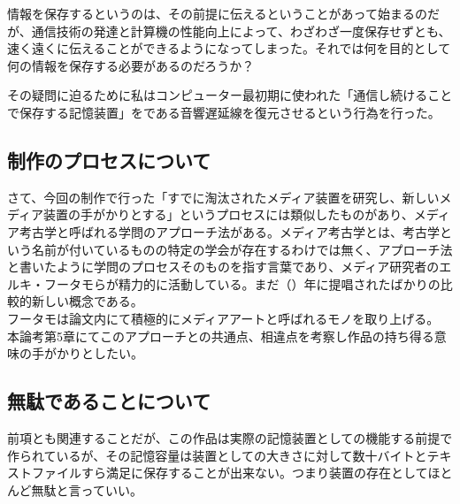 情報を保存するというのは、その前提に伝えるということがあって始まるのだが、通信技術の発達と計算機の性能向上によって、わざわざ一度保存せずとも、速く遠くに伝えることができるようになってしまった。それでは何を目的として何の情報を保存する必要があるのだろうか？

その疑問に迫るために私はコンピューター最初期に使われた「通信し続けることで保存する記憶装置」をである音響遅延線を復元させるという行為を行った。

\subsection{制作のプロセスについて}\label{ux5236ux4f5cux306eux30d7ux30edux30bbux30b9ux306bux3064ux3044ux3066}

さて、今回の制作で行った「すでに淘汰されたメディア装置を研究し、新しいメディア装置の手がかりとする」というプロセスには類似したものがあり、メディア考古学と呼ばれる学問のアプローチ法がある。メディア考古学とは、考古学という名前が付いているものの特定の学会が存在するわけでは無く、アプローチ法と書いたように学問のプロセスそのものを指す言葉であり、メディア研究者のエルキ・フータモらが精力的に活動している。まだ（）年に提唱されたばかりの比較的新しい概念である。\\
フータモは論文内にて積極的にメディアアートと呼ばれるモノを取り上げる。\\
本論考第5章にてこのアプローチとの共通点、相違点を考察し作品の持ち得る意味の手がかりとしたい。

\subsection{無駄であることについて}\label{ux7121ux99c4ux3067ux3042ux308bux3053ux3068ux306bux3064ux3044ux3066}

前項とも関連することだが、この作品は実際の記憶装置としての機能する前提で作られているが、その記憶容量は装置としての大きさに対して数十バイトとテキストファイルすら満足に保存することが出来ない。つまり装置の存在としてほとんど無駄と言っていい。
